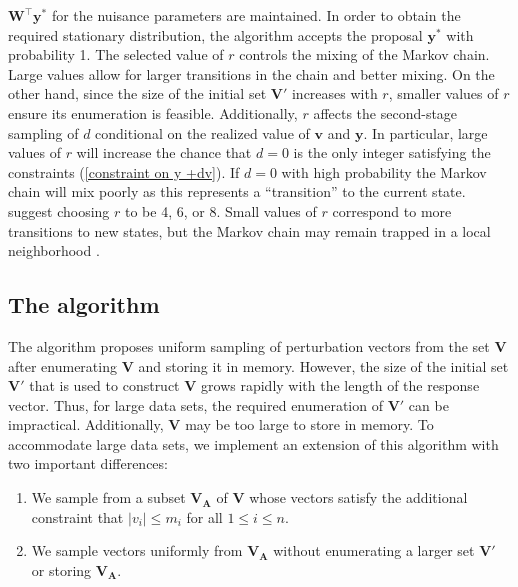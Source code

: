 \documentclass[article, shortnames]{jss}
\begin{document}
$\mathbf{W}^\top\mathbf{y}^\ast$ for the
nuisance parameters are maintained.
In order to obtain the required stationary
distribution, the algorithm accepts the
proposal $\mathbf{y}^{\ast }$ with probability 1.
The selected value of $r$ controls the mixing of the Markov chain.
Large values allow for larger transitions in the chain and better mixing.
On the other hand, since the size of the initial set $\mathbf{V}'$
increases with $r$, smaller values of $r$ ensure its enumeration is
feasible. Additionally, $r$ affects the second-stage sampling of $d$
conditional on the realized value of $\mathbf{v}$ and $\mathbf{y}$.
In particular, large values of $r$ will increase the chance that $d=0$
is the only integer satisfying the constraints (\ref{constraint on y +dv}).
If $d=0$ with high probability the Markov chain will mix poorly as
this represents a ``transition'' to the current state.
\citet{Forster:2003} suggest choosing $r$ to be 4, 6, or 8. Small
values of $r$ correspond to more transitions to new states, but the
Markov chain may remain trapped in a local neighborhood
\citep{Forster:2003,Zamar:2006}.

\subsection[The elrm algorithm]{The  algorithm}

The \citet{Forster:2003} algorithm proposes uniform sampling
of perturbation vectors from the set $\mathbf{V}$ after enumerating
$\mathbf{V}$ and storing it in memory.
However, the size of the initial set $\mathbf{V}'$ that is used to construct
$\mathbf{V}$ grows rapidly with the length of the response vector.
Thus, for large data sets, the required enumeration of $\mathbf{V}'$
can be impractical. Additionally,
$\mathbf{V}$ may be too large to store in memory.
To accommodate large data sets, we implement an extension
of this algorithm with two important differences:
\begin{enumerate}
\item We sample from a subset ${\mathbf{V_{A}}}$ of ${\mathbf{V}}$ whose
vectors satisfy the additional constraint that $|v_{i}|\leq m_{i}$ for all $%
1\leq i\leq n$.

\item We sample vectors uniformly from ${\mathbf{V_{A}}}$ without
enumerating a larger set $\mathbf{V}'$ or storing $\mathbf{V_A}$.

\end{enumerate}
\end{document}

